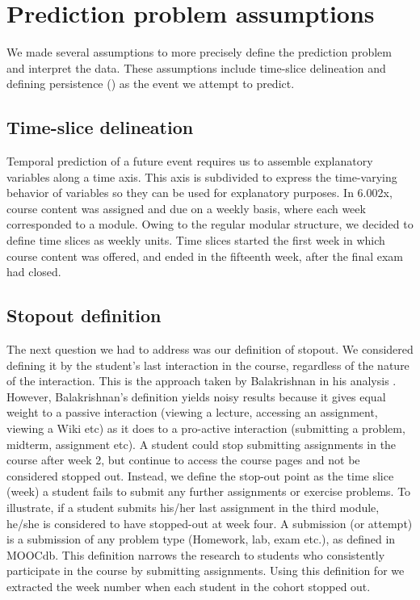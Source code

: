 \section{Prediction problem assumptions}
We made several assumptions to more precisely define the \sti prediction problem and interpret the data. These assumptions include time-slice delineation and defining persistence (\sti) as the event we attempt to predict.

\subsection{Time-slice delineation}
Temporal prediction of a future event requires us to assemble explanatory variables along a time axis. This axis is subdivided to express the time-varying behavior of variables so they can be used for explanatory purposes. In 6.002x, course content was assigned and due on a weekly basis, where each week corresponded to a module. Owing to the regular modular structure, we decided to define time slices as weekly units. Time slices started the first week in which course content was offered, and ended in the fifteenth week, after the final exam had closed.

\subsection{Stopout definition}
The next question we had to address was our definition of stopout. We considered defining it by the student's last interaction in the course, regardless of the nature of the interaction. This is the approach taken by Balakrishnan in his \sti analysis \cite{balakrishnan2013predicting}. However, Balakrishnan's definition yields noisy results because it gives equal weight to a passive interaction (viewing a lecture, accessing an assignment, viewing a Wiki etc) as it does to a pro-active interaction (submitting a problem, midterm, assignment etc). A student could stop submitting assignments in the course after week 2, but continue to access the course pages and not be considered stopped out. Instead, we define the stop-out point as the time slice (week) a student fails to submit any further assignments or exercise problems. To illustrate, if a student submits his/her last assignment in the third module, he/she is considered to have stopped-out at week four. A submission (or attempt) is a submission of any problem type (Homework, lab, exam etc.), as defined in MOOCdb. This definition narrows the research to students who consistently participate in the course by submitting assignments. Using this definition for \sti we extracted the week number when each student in the cohort stopped out.

